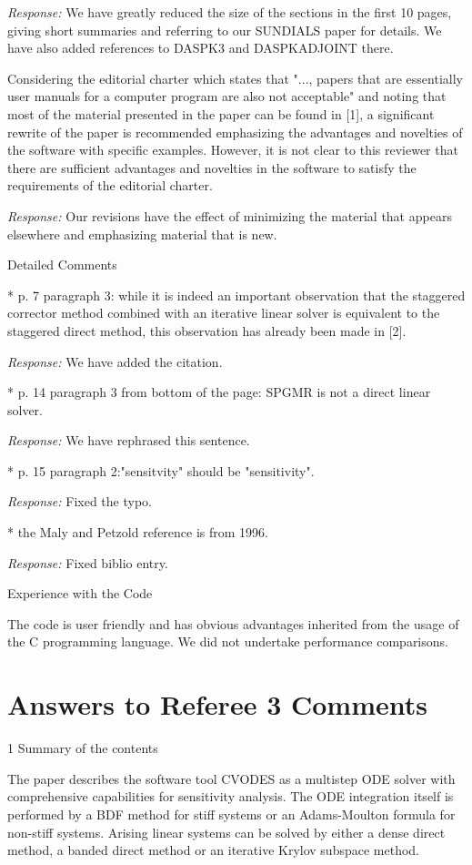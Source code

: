 {\em Response:}
We have greatly reduced the size of the sections in the first 10
pages, giving short summaries and referring to our SUNDIALS paper for
details.  We have also added references to DASPK3 and DASPKADJOINT
there.

Considering the editorial charter which states that "..., papers that
are essentially user manuals for a computer program are also not
acceptable" and noting that most of the material presented in the
paper can be found in [1], a significant rewrite of the paper is
recommended emphasizing the advantages and novelties of the software
with specific examples. However, it is not clear to this reviewer that
there are sufficient advantages and novelties in the software to
satisfy the requirements of the editorial charter.

{\em Response:} 
Our revisions have the effect of minimizing the material that appears
elsewhere and emphasizing material that is new.

Detailed Comments

* p. 7 paragraph 3: while it is indeed an important observation that
the staggered corrector method combined with an iterative linear
solver is equivalent to the staggered direct method, this observation
has already been made in [2].

{\em Response:}
We have added the citation.

* p. 14 paragraph 3 from bottom of the page: SPGMR is not a direct
linear solver.

{\em Response:}
We have rephrased this sentence.

* p. 15 paragraph 2:"sensitvity" should be "sensitivity".

{\em Response:}
Fixed the typo.

* the Maly and Petzold reference is from 1996.

{\em Response:} Fixed biblio entry.

Experience with the Code

The code is user friendly and has obvious advantages inherited from
the usage of the C programming language. We did not undertake
performance comparisons.


\newpage
\section{Answers to Referee 3 Comments}

1 Summary of the contents

The paper describes the software tool CVODES as a multistep ODE solver
with comprehensive capabilities for sensitivity analysis. The ODE
integration itself is performed by a BDF method for stiff systems or
an Adams-Moulton formula for non-stiff systems. Arising linear systems
can be solved by either a dense direct method, a banded direct method
or an iterative Krylov subspace method.

